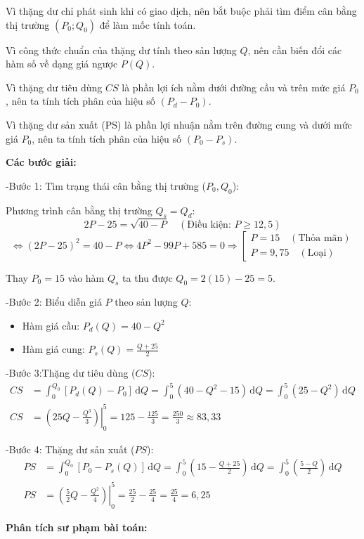 \documentclass[12pt,a4paper,oneside]{book}
\theoremstyle{theorem}
\theoremstyle{definition}
\begin{document}
Vì thặng dư chỉ phát sinh khi có giao dịch, nên bắt buộc phải tìm điểm cân bằng thị trường $(P_0; Q_0)$ để làm mốc tính toán.

Vì công thức chuẩn của thặng dư tính theo sản lượng $Q$, nên cần biến đổi các hàm số về dạng giá ngược $P(Q)$.

Vì thặng dư tiêu dùng $CS$ là phần lợi ích nằm dưới đường cầu và trên mức giá $P_{0}$, nên ta tính tích phân của hiệu số $(P_d - P_0)$.

Vì thặng dư sản xuất (PS) là phần lợi nhuận nằm trên đường cung và dưới mức giá $P_{0}$, nên ta tính tích phân của hiệu số $(P_0 - P_s)$.
\begin{center}
    \textbf{Các bước giải:}
\end{center}

-Bước 1: Tìm trạng thái cân bằng thị trường ($P_0, Q_0$):
    
    Phương trình cân bằng thị trường $Q_s = Q_d$:
    \[
    2P - 25 = \sqrt{40 - P} \quad (\text{Điều kiện: } P \ge 12{,}5)
    \]
    \[
    \Leftrightarrow (2P - 25)^2 = 40 - P \Leftrightarrow 4P^2 - 99P + 585 = 0 \Rightarrow \left[ \begin{array}{l} P = 15 \quad (\text{Thỏa mãn}) \\ P = 9{,}75 \quad (\text{Loại}) \end{array} \right.
    \]
    
    Thay $P_0 = 15$ vào hàm $Q_s$ ta thu được $Q_0 = 2(15) - 25 = 5$.

    -Bước 2: Biểu diễn giá $P$ theo sản lượng $Q$:
    \begin{itemize}
        \item Hàm giá cầu: $P_d(Q) = 40 - Q^2$
        \item Hàm giá cung: $P_s(Q) = \frac{Q + 25}{2}$
    \end{itemize}

    -Bước 3:Thặng dư tiêu dùng ($CS$):
    \begin{align*}
    CS &= \int_0^{Q_0} [P_d(Q) - P_0] \, \mathrm{d}Q = \int_0^5 (40 - Q^2 - 15) \, \mathrm{d}Q = \int_0^5 (25 - Q^2) \, \mathrm{d}Q\\[0.8em]
    CS &= \left. \left( 25Q - \frac{Q^3}{3} \right) \right|_0^5 = 125 - \frac{125}{3} = \frac{250}{3} \approx 83{,}33
    \end{align*}

 -Bước 4: Thặng dư sản xuất ($PS$):
    \begin{align*}
    PS &= \int_0^{Q_0} [P_0 - P_s(Q)] \, \mathrm{d}Q = \int_0^5 \left( 15 - \frac{Q + 25}{2} \right) \, \mathrm{d}Q = \int_0^5 \left( \frac{5 - Q}{2} \right) \, \mathrm{d}Q\\[0.8em]
    PS &= \left. \left( \frac{5}{2}Q - \frac{Q^2}{4} \right) \right|_0^5 = \frac{25}{2} - \frac{25}{4} = \frac{25}{4} = 6{,}25
    \end{align*}
    \begin{center}
\textbf{Phân tích sư phạm bài toán:}
\end{center}
\end{document}
